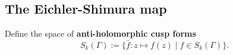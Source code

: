 









\subsection{The Eichler-Shimura map}
Define the space of \textbf{anti-holomorphic cusp forms}
\[\overline{S_k(\Gamma)} := \{\bar{f} :  z\mapsto \overline{f(z)}\mid f\in S_k(\Gamma)\}.\]

